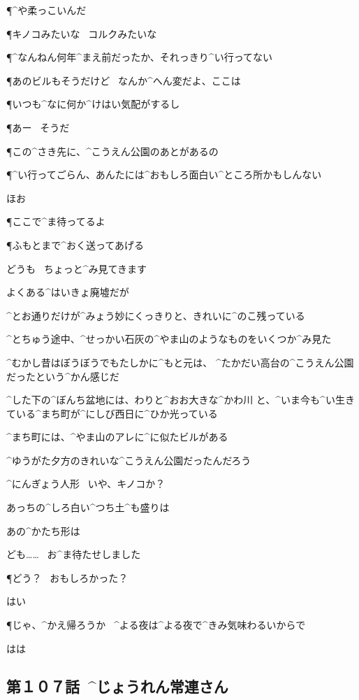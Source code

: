 \P ^{や}{柔}っこいんだ

\P キノコみたいな
\ コルクみたいな

\P ^{なんねん}{何年}^{まえ}{前}だったか、それっきり^{い}{行}ってない

\page
\P あのビルもそうだけど
\ なんか^{へん}{変}だよ、ここは

\P いつも^{なに}{何}か^{けはい}{気配}がするし

\P あー
\ そうだ

\P この^{さき}{先}に、^{こうえん}{公園}のあとがあるの

\P ^{い}{行}ってごらん、あんたには^{おもしろ}{面白}い^{ところ}{所}かもしんない

\Y ほお

\P ここで^{ま}{待}ってるよ

\P ふもとまで^{おく}{送}ってあげる

\Y どうも
\ ちょっと^{み}{見}てきます

\page
\Y よくある^{はいきょ}{廃墟}だが

\Y ^{とお}{通}りだけが^{みょう}{妙}にくっきりと、きれいに^{のこ}{残}っている

\Y ^{とちゅう}{途中}、^{せっかい}{石灰}の^{やま}{山}のようなものをいくつか^{み}{見}た

\page
\Y ^{むかし}{昔}はぼうぼうでもたしかに^{もと}{元}は、
^{たかだい}{高台}の^{こうえん}{公園}だったという^{かん}{感}じだ

\Y ^{した}{下}の^{ぼんち}{盆地}には、わりと^{おお}{大}きな^{かわ}{川}
と、^{いま}{今}も^{い}{生}きている^{まち}{町}が^{にしび}{西日}に^{ひか}{光}っている

\Y ^{まち}{町}には、^{やま}{山}のアレに^{に}{似}たビルがある

\Y ^{ゆうがた}{夕方}のきれいな^{こうえん}{公園}だったんだろう

\page[97]
\Y ^{にんぎょう}{人形}
\ いや、キノコか？

\Y あっちの^{しろ}{白}い^{つち}{土}^{も}{盛}りは

\T あの^{かたち}{形}は

\page
\Y ども……
\ お^{ま}{待}たせしました

\P どう？
\ おもしろかった？

\Y はい

\P じゃ、^{かえ}{帰}ろうか
\ ^{よる}{夜}は^{よる}{夜}で^{きみ}{気味}わるいからで

\Y はは


\subsection{第１０７話\ ^{じょうれん}{常連}さん}

